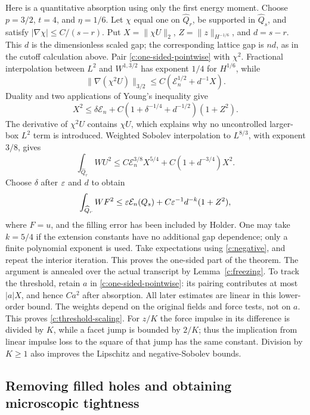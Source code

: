 Here is a quantitative absorption using only the first energy moment.
Choose $p=3/2$, $t=4$, and $\eta=1/6$. Let $\chi$ equal one on
$\widehat Q_r$, be supported in $\widehat Q_s$, and satisfy
$|\nabla\chi|\le C/(s-r)$. Put
$X=\|\chi U\|_2$, $Z=\|z\|_{H^{-1/6}}$, and $d=s-r$.
This $d$ is the dimensionless scaled gap; the corresponding lattice
gap is $nd$, as in the cutoff calculation above.
Pair \eqref{c:one-sided-pointwise} with $\chi^2$. Fractional
interpolation between $L^2$ and $W^{1,3/2}$ has exponent $1/4$
for $H^{1/6}$, while
\[
 \|\nabla(\chi^2U)\|_{3/2}
 \le C(\mathcal E_n^{1/2}+d^{-1}X).
\]
Duality and two applications of Young's inequality give
\[
 X^2\le\delta\mathcal E_n
 +C(1+\delta^{-1/4}+d^{-1/2})(1+Z^2).
\]
The derivative of $\chi^2U$ contains $\chi U$, which explains why
no uncontrolled larger-box $L^2$ term is introduced. Weighted Sobolev
interpolation to $L^{8/3}$, with exponent $3/8$, gives
\[
 \int_{\widehat Q_r}WU^2
 \le C\mathcal E_n^{3/8}X^{5/4}
       +C(1+d^{-3/4})X^2.
\]
Choose $\delta$ after $\varepsilon$ and $d$ to obtain
\begin{equation}\label{c:one-sided-absorb}
 \int_{\widehat Q_r}WF^2\le\varepsilon\mathcal E_n(Q_s)
            +C\varepsilon^{-1}d^{-k}(1+Z^2),
\end{equation}
where $F=u$, and the filling error has been included by Holder.
One may take $k=5/4$ if the extension constants have no additional
gap dependence; only a finite polynomial exponent is used.
Take expectations using \eqref{c:negative}, and repeat the interior
iteration. This proves the one-sided part of the theorem. The
argument is annealed over the actual transcript by Lemma~\ref{c:freezing}.
To track the threshold, retain $a$ in
\eqref{c:one-sided-pointwise}: its pairing contributes at most
$|a|X$, and hence $C a^2$ after absorption. All later estimates are
linear in this lower-order bound. The weights depend on the original
fields and force tests, not on $a$. This proves
\eqref{c:threshold-scaling}. For $z/K$ the force impulse in its
difference is divided by $K$, while a facet jump is bounded by
$2/K$; thus the implication from linear impulse loss to the square
of that jump has the same constant. Division by $K\ge1$ also
improves the Lipschitz and negative-Sobolev bounds.

\subsection{Removing filled holes and obtaining microscopic tightness}

